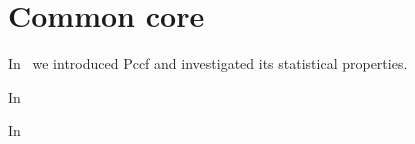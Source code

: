 \chapter{Common core}
In~\cite{MaslovSDM2016} we introduced Pccf and investigated its statistical properties.

In~\cite{MaslovIJCNN2017}

In~\cite{Maslov2021}


